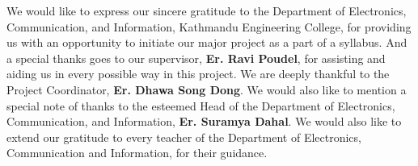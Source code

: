 We would like to express our sincere gratitude to the Department of Electronics, Communication, and Information, Kathmandu Engineering College, for providing us with an opportunity to initiate our major project as a part of a syllabus. And a special thanks goes to our supervisor, \textbf{Er. Ravi Poudel}, for assisting and aiding us in every possible way in this project. We are deeply thankful to the Project Coordinator, \textbf{Er. Dhawa Song Dong}. We would also like to mention a special note of thanks to the esteemed Head of the Department of Electronics, Communication, and Information, \textbf{Er. Suramya Dahal}. We would also like to extend our gratitude to every teacher of the Department of Electronics, Communication and Information, for their guidance.